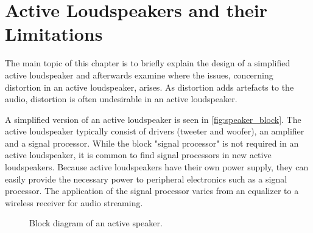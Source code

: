 


\chapter{Active Loudspeakers and their Limitations}
The main topic of this chapter is to briefly explain the design of a simplified active loudspeaker and afterwards examine where the issues, concerning distortion in an active loudspeaker, arises. As distortion adds artefacts to the audio, distortion is often undesirable in an active loudspeaker. 

A simplified version of an active loudspeaker is seen in \autoref{fig:speaker_block}. The active loudspeaker typically consist of drivers (tweeter and woofer), an amplifier and a signal processor. While the block "signal processor" is not required in an active loudspeaker, it is common to find signal processors in new active loudspeakers. Because active loudspeakers have their own power supply, they can easily provide the necessary power to peripheral electronics such as a signal processor. The application of the signal processor varies from an equalizer to a wireless receiver for audio streaming.

\begin{figure}[H]
\centering
{}
\scalebox{0.9}{
}
\caption{Block diagram of an active speaker.}
\label{fig:speaker_block}
\end{figure}

